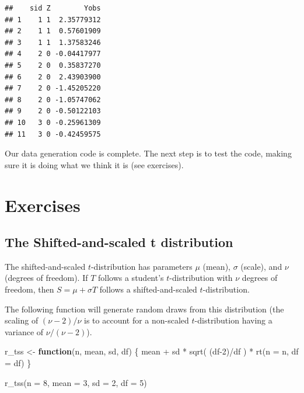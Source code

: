 \documentclass[
]{book}
\newenvironment{Shaded}{\begin{snugshade}}{\end{snugshade}}
\newcommand{\AttributeTok}[1]{\textcolor[rgb]{0.77,0.63,0.00}{#1}}
\newcommand{\ControlFlowTok}[1]{\textcolor[rgb]{0.13,0.29,0.53}{\textbf{#1}}}
\newcommand{\DecValTok}[1]{\textcolor[rgb]{0.00,0.00,0.81}{#1}}
\newcommand{\FunctionTok}[1]{\textcolor[rgb]{0.00,0.00,0.00}{#1}}
\newcommand{\NormalTok}[1]{#1}
\newcommand{\OtherTok}[1]{\textcolor[rgb]{0.56,0.35,0.01}{#1}}
\newcommand{\SpecialCharTok}[1]{\textcolor[rgb]{0.00,0.00,0.00}{#1}}
\begin{document}
\begin{verbatim}
##    sid Z        Yobs
## 1    1 1  2.35779312
## 2    1 1  0.57601909
## 3    1 1  1.37583246
## 4    2 0 -0.04417977
## 5    2 0  0.35837270
## 6    2 0  2.43903900
## 7    2 0 -1.45205220
## 8    2 0 -1.05747062
## 9    2 0 -0.50122103
## 10   3 0 -0.25961309
## 11   3 0 -0.42459575
\end{verbatim}

Our data generation code is complete.
The next step is to test the code, making sure it is doing what we think it is (see exercises).

\hypertarget{exercises}{%
\section{Exercises}\label{exercises}}

\hypertarget{ex_dgp}{%
\subsection{The Shifted-and-scaled t distribution}\label{ex_dgp}}

The shifted-and-scaled \(t\)-distribution has parameters \(\mu\) (mean), \(\sigma\) (scale), and \(\nu\) (degrees of freedom).
If \(T\) follows a student's \(t\)-distribution with \(\nu\) degrees of freedom, then \(S = \mu + \sigma T\) follows a shifted-and-scaled \(t\)-distribution.

The following function will generate random draws from this distribution (the scaling of \((\nu-2)/\nu\) is to account for a non-scaled \(t\)-distribution having a variance of \(\nu/(\nu-2)\)).

\begin{Shaded}
\begin{Highlighting}[]
\NormalTok{r\_tss }\OtherTok{\textless{}{-}} \ControlFlowTok{function}\NormalTok{(n, mean, sd, df) \{}
\NormalTok{  mean }\SpecialCharTok{+}\NormalTok{ sd }\SpecialCharTok{*} \FunctionTok{sqrt}\NormalTok{( (df}\DecValTok{{-}2}\NormalTok{)}\SpecialCharTok{/}\NormalTok{df ) }\SpecialCharTok{*} \FunctionTok{rt}\NormalTok{(}\AttributeTok{n =}\NormalTok{ n, }\AttributeTok{df =}\NormalTok{ df)}
\NormalTok{\}}

\FunctionTok{r\_tss}\NormalTok{(}\AttributeTok{n =} \DecValTok{8}\NormalTok{, }\AttributeTok{mean =} \DecValTok{3}\NormalTok{, }\AttributeTok{sd =} \DecValTok{2}\NormalTok{, }\AttributeTok{df =} \DecValTok{5}\NormalTok{)}
\end{Highlighting}
\end{Shaded}
\end{document}
